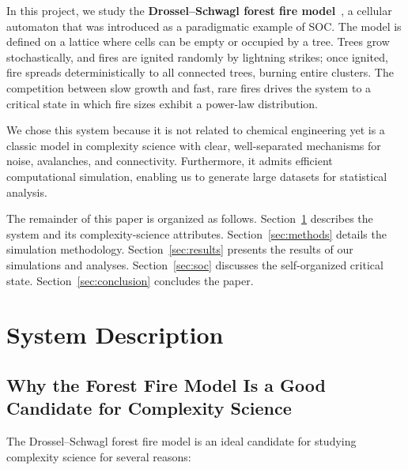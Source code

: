 \documentclass[12pt, a4paper, twocolumn]{article}
\begin{document}
In this project, we study the \textbf{Drossel--Schwagl forest fire model}~\citep{drossel1992}, a cellular automaton that was introduced as a paradigmatic example of SOC.
The model is defined on a lattice where cells can be empty or occupied by a tree.
Trees grow stochastically, and fires are ignited randomly by lightning strikes; once ignited, fire spreads deterministically to all connected trees, burning entire clusters.
The competition between slow growth and fast, rare fires drives the system to a critical state in which fire sizes exhibit a power-law distribution.

We chose this system because it is not related to chemical engineering yet is a classic model in complexity science with clear, well-separated mechanisms for noise, avalanches, and connectivity.
Furthermore, it admits efficient computational simulation, enabling us to generate large datasets for statistical analysis.

The remainder of this paper is organized as follows.
Section~\ref{sec:system} describes the system and its complexity-science attributes.
Section~\ref{sec:methods} details the simulation methodology.
Section~\ref{sec:results} presents the results of our simulations and analyses.
Section~\ref{sec:soc} discusses the self-organized critical state.
Section~\ref{sec:conclusion} concludes the paper.

\section{System Description}
\label{sec:system}

\subsection{Why the Forest Fire Model Is a Good Candidate for Complexity Science}

The Drossel--Schwagl forest fire model is an ideal candidate for studying complexity science for several reasons:
\end{document}
